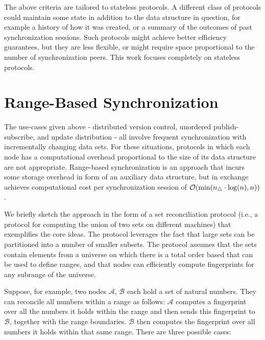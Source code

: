 The above criteria are tailored to stateless protocols. A different class of protocols could maintain some state in addition to the data structure in question, for example a history of how it was created, or a summary of the outcomes of past synchronization sessions. Such protocols might achieve better efficiency guarantees, but they are less flexible, or might require space proportional to the number of synchronization peers. This work focuses completely on stateless protocols.

\section{Range-Based Synchronization}
\label{recursively-comparing-fingerprints}

The use-cases given above - distributed version control, unordered publish-subscribe, and update distribution - all involve frequent synchronization with incrementally changing data sets. For these situations, protocols in which each node has a computational overhead proportional to the size of its data structure are not appropriate. Range-based synchronization is an approach that incurs some storage overhead in form of an auxiliary data structure, but in exchange achieves computational cost per synchronization session  of $\mathcal{O}(\min(n_{\triangle} \cdot \log(n), n))$.

We briefly sketch the approach in the form of a set reconciliation
protocol (i.e., a protocol for computing the union of two sets on
different machines) that exemplifies the core ideas. The protocol
leverages the fact that large sets can be partitioned into a number of smaller
subsets. The protocol assumes that the sets contain elements from
a universe on which there is a total order based that can be used to define ranges, and that nodes can efficiently compute fingerprints for any subrange of the
universe.

Suppose, for example, two nodes $\mathcal{A}$, $\mathcal{B}$ each hold a set of natural numbers.
They can reconcile all numbers within a range as follows: $\mathcal{A}$ computes
a fingerprint over all the numbers it holds within the range and then sends this
fingerprint to $\mathcal{B}$, together with the range boundaries. $\mathcal{B}$ then computes
the fingerprint over all numbers it holds within that same range. There
are three possible cases:


